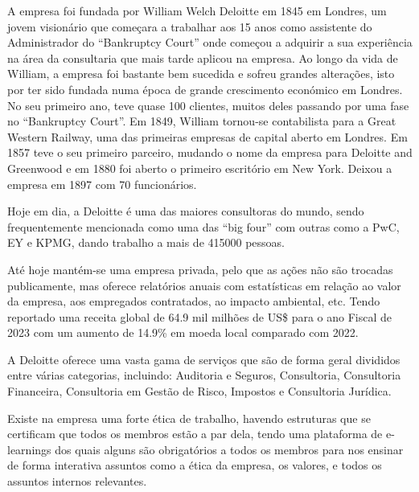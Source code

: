         A empresa foi fundada por William Welch Deloitte em 1845 em Londres, um jovem visionário que começara a trabalhar aos 15 anos como assistente do Administrador do ``Bankruptcy Court'' onde começou a adquirir a sua experiência na área da consultaria que mais tarde aplicou na empresa. 
        Ao longo da vida de William, a empresa foi bastante bem sucedida e sofreu grandes alterações, isto por ter sido fundada numa época de grande crescimento económico em Londres. No seu primeiro ano, teve quase 100 clientes, muitos deles passando por uma fase no ``Bankruptcy Court''. Em 1849, William tornou-se contabilista para a Great Western Railway, uma das primeiras empresas de capital aberto em Londres\cite{william-deloitte}. Em 1857 teve o seu primeiro parceiro, mudando o nome da empresa para Deloitte and Greenwood e em 1880 foi aberto o primeiro escritório em New York\cite{deloitte-uk-history-yt}. Deixou a empresa em 1897 com 70 funcionários\cite{william-deloitte}.
    
        Hoje em dia, a Deloitte é uma das maiores consultoras do mundo, sendo frequentemente mencionada como uma das ``big four'' com outras como a PwC, EY e KPMG\cite{euronews-bigfour}, dando trabalho a mais de \num{415000} pessoas\cite{deloitte-stats}.
    
        Até hoje mantém-se uma empresa privada, pelo que as ações não são trocadas publicamente, mas oferece relatórios anuais com estatísticas em relação ao valor da empresa, aos empregados contratados, ao impacto ambiental, etc.
        Tendo reportado uma receita global de \num{64.9} mil milhões de US\$ para o ano Fiscal de 2023 com um aumento de 14.9\% em moeda local comparado com 2022\cite{deloitte_in_2023}.
        
    
        A Deloitte oferece uma vasta gama de serviços que são de forma geral divididos entre várias categorias, incluindo: Auditoria e Seguros, Consultoria, Consultoria Financeira, Consultoria em Gestão de Risco, Impostos e Consultoria Jurídica.
        
        Existe na empresa uma forte ética de trabalho, havendo estruturas que se certificam que todos os membros estão a par dela, tendo uma plataforma de e-learnings dos quais alguns são obrigatórios a todos os membros para nos ensinar de forma interativa assuntos como a ética da empresa, os valores, e todos os assuntos internos relevantes. 
    
